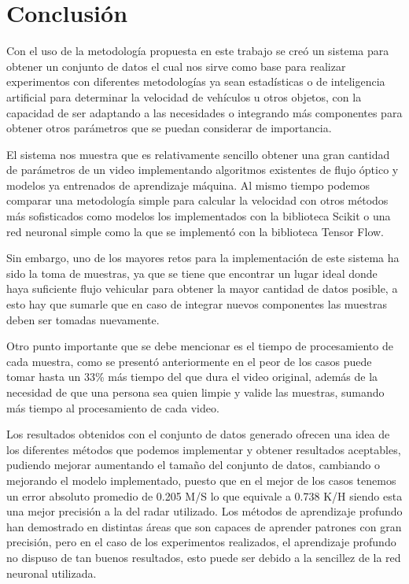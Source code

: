 \section{Conclusión}

Con el uso de la metodología propuesta en este trabajo se creó un sistema para obtener un conjunto de datos el cual nos sirve como base para realizar experimentos con diferentes metodologías ya sean estadísticas o de inteligencia artificial para determinar la velocidad de vehículos u otros objetos, con la capacidad de ser adaptando a las necesidades o integrando más componentes para obtener otros parámetros que se puedan considerar de importancia.

El sistema nos muestra que es relativamente sencillo obtener una gran cantidad de parámetros de un video implementando algoritmos existentes de flujo óptico y modelos ya entrenados de aprendizaje máquina. Al mismo tiempo podemos comparar una metodología simple para calcular la velocidad con otros métodos más sofisticados como modelos los implementados con la biblioteca Scikit o una red neuronal simple como la que se implementó con la biblioteca Tensor Flow.

Sin embargo, uno de los mayores retos para la implementación de este sistema ha sido la toma de muestras, ya que se tiene que encontrar un lugar ideal donde haya suficiente flujo vehicular para obtener la mayor cantidad de datos posible, a esto hay que sumarle que en caso de integrar nuevos componentes las muestras deben ser tomadas nuevamente.

Otro punto importante que se debe mencionar es el tiempo de procesamiento de cada muestra, como se presentó anteriormente en el peor de los casos puede tomar hasta un 33\% más tiempo del que dura el video original, además de la necesidad de que una persona sea quien limpie y valide las muestras, sumando más tiempo al procesamiento de cada video.

Los resultados obtenidos con el conjunto de datos generado ofrecen una idea de los diferentes métodos que podemos implementar y obtener resultados aceptables, pudiendo mejorar aumentando el tamaño del conjunto de datos, cambiando o mejorando el modelo implementado, puesto que en el mejor de los casos tenemos un error absoluto promedio de 0.205 M/S lo que equivale a 0.738 K/H siendo esta una mejor precisión a la del radar utilizado. Los métodos de aprendizaje profundo han demostrado en distintas áreas que son capaces de aprender patrones con gran precisión, pero en el caso de los experimentos realizados, el aprendizaje profundo no dispuso de tan buenos resultados, esto puede ser debido a la sencillez de la red neuronal utilizada.
